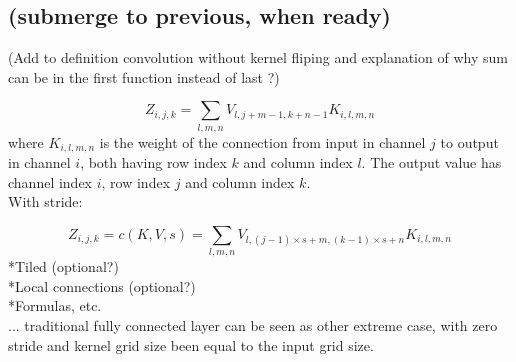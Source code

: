 \documentclass[]{article}
\begin{document}

\subsection{(submerge to previous, when ready)}
(Add to definition convolution without kernel fliping and explanation of why sum
can be in the first function instead of last ?)

\[
Z_{i, j, k} = \sum_{l, m, n} V_{l, j + m -1, k + n -1} K_{i, l, m, n}
\]
where $K_{i, l, m, n}$ is the weight of the connection from input in channel $j$
to output in channel $i$, both having row index $k$ and column index $l$. The output
value has channel index $i$, row index $j$ and column index $k$.\\
With stride:

\[
Z_{i, j, k} = c(K, V, s) =
\sum_{l, m, n} V_{l, (j -1)\times s + m, (k-1)\times s + n} K_{i, l, m, n}
\]
*Tiled (optional?)\\
*Local connections (optional?)\\
*Formulas, etc.\\
... traditional fully connected layer can be seen
as other extreme case, with zero stride and kernel grid size been equal to the
input grid size.
\end{document}
